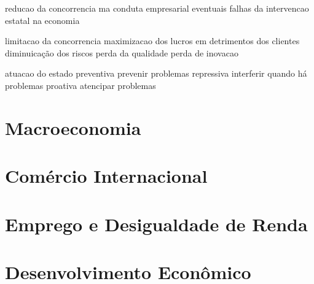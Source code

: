 \documentclass{article}
\begin{document}
            reducao da concorrencia
                ma conduta empresarial
                eventuais falhas da intervencao estatal na economia

            limitacao da concorrencia
                maximizacao dos lucros
                    em detrimentos dos clientes
                diminuicação dos riscos
                    perda da qualidade
                    perda de inovacao
                
            atuacao do estado
                preventiva
                    prevenir problemas
                repressiva
                    interferir quando há problemas
                proativa
                    atencipar problemas

    \section{Macroeconomia}

    \section{Comércio Internacional}

    \section{Emprego e Desigualdade de Renda}

    \section{Desenvolvimento Econômico}
\end{document}
